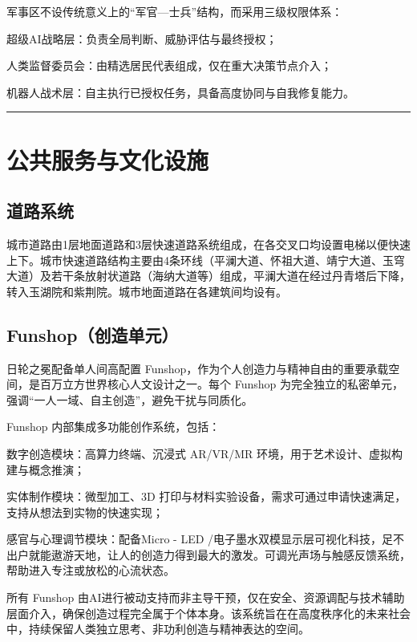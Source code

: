 军事区不设传统意义上的``军官---士兵''结构，而采用三级权限体系：

超级AI战略层：负责全局判断、威胁评估与最终授权；

人类监督委员会：由精选居民代表组成，仅在重大决策节点介入；

机器人战术层：自主执行已授权任务，具备高度协同与自我修复能力。

\begin{center}\rule{0.5\linewidth}{0.5pt}\end{center}

\section{公共服务与文化设施}\label{ux516cux5171ux670dux52a1ux4e0eux6587ux5316ux8bbeux65bd}

\subsection{道路系统}\label{ux9053ux8defux7cfbux7edf}

城市道路由1层地面道路和3层快速道路系统组成，在各交叉口均设置电梯以便快速上下。城市快速道路结构主要由4条环线（平澜大道、怀祖大道、靖宁大道、玉穹大道）及若干条放射状道路（海纳大道等）组成，平澜大道在经过丹青塔后下降，转入玉湖院和紫荆院。城市地面道路在各建筑间均设有。

\subsection{Funshop（创造单元）}\label{funshopux521bux9020ux5355ux5143}

日轮之冕配备单人间高配置 Funshop，作为个人创造力与精神自由的重要承载空间，是百万立方世界核心人文设计之一。每个 Funshop 为完全独立的私密单元，强调``一人一域、自主创造''，避免干扰与同质化。

Funshop 内部集成多功能创作系统，包括：

数字创造模块：高算力终端、沉浸式 AR/VR/MR 环境，用于艺术设计、虚拟构建与概念推演；

实体制作模块：微型加工、3D 打印与材料实验设备，需求可通过申请快速满足，支持从想法到实物的快速实现；

感官与心理调节模块：配备Micro - LED /电子墨水双模显示层可视化科技，足不出户就能遨游天地，让人的创造力得到最大的激发。可调光声场与触感反馈系统，帮助进入专注或放松的心流状态。

所有 Funshop 由AI进行被动支持而非主导干预，仅在安全、资源调配与技术辅助层面介入，确保创造过程完全属于个体本身。该系统旨在在高度秩序化的未来社会中，持续保留人类独立思考、非功利创造与精神表达的空间。

